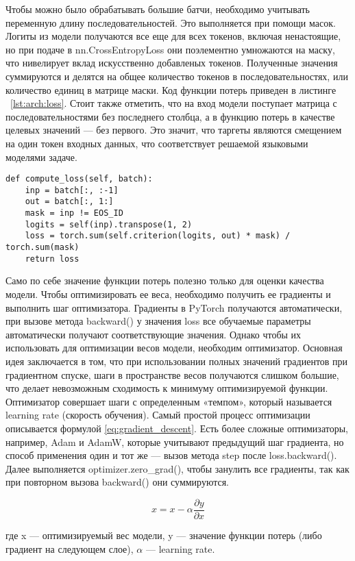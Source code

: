 Чтобы можно было обрабатывать большие батчи, необходимо учитывать переменную длину последовательностей. Это выполняется при помощи масок. Логиты из модели получаются все еще для всех токенов, включая ненастоящие, но при подаче в nn.CrossEntropyLoss они поэлементно умножаются на маску, что нивелирует вклад искусственно добавленых токенов. Полученные значения суммируются и делятся на общее количество токенов в последовательностях, или количество единиц в матрице маски. Код функции потерь приведен в листинге ~\ref{lst:arch:loss}. Стоит также отметить, что на вход модели поступает матрица с последовательностями без последнего столбца, а в функцию потерь в качестве целевых значений --- без первого. Это значит, что таргеты являются смещением на один токен входных данных, что соответствует решаемой языковыми моделями задаче.

\begin{lstlisting}[caption={Расчет функции потерь}, label=lst:arch:loss]
def compute_loss(self, batch):
	inp = batch[:, :-1]
	out = batch[:, 1:]
	mask = inp != EOS_ID
	logits = self(inp).transpose(1, 2)
	loss = torch.sum(self.criterion(logits, out) * mask) / torch.sum(mask)
	return loss
\end{lstlisting}

Само по себе значение функции потерь полезно только для оценки качества модели. Чтобы оптимизировать ее веса, необходимо получить ее градиенты и выполнить шаг оптимизатора. Градиенты в PyTorch получаются автоматически, при вызове метода backward() у значения loss все обучаемые параметры автоматически получают соответствующие значения. Однако чтобы их использовать для оптимизации весов модели, необходим оптимизатор. Основная идея заключается в том, что при использовании полных значений градиентов при градиентном спуске, шаги в пространстве весов получаются слишком большие, что делает невозможным сходимость к минимуму оптимизируемой функции. Оптимизатор совершает шаги с определенным «темпом», который называется learning rate (скорость обучения). Самый простой процесс оптимизации описывается формулой \ref{eq:gradient_descent}. Есть более сложные оптимизаторы, например, Adam и AdamW, которые учитывают предыдущий шаг градиента, но способ применения один и тот же --- вызов метода step после loss.backward(). Далее выполняется optimizer.zero\_grad(), чтобы занулить все градиенты, так как при повторном вызова backward() они суммируются.

\begin{equation}
	x = x - \alpha \frac{\partial y}{\partial x}
	\label{eq:gradient_descent}
\end{equation}
\begin{explanation}
	где x --- оптимизируемый вес модели,
	y --- значение функции потерь (либо \\ градиент на следующем слое),
	$\alpha$ --- learning rate.
\end{explanation}

